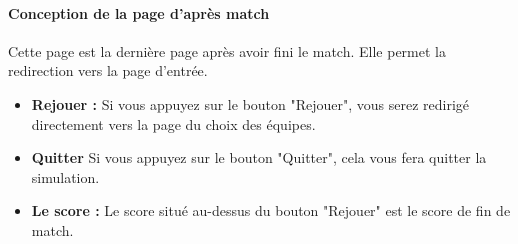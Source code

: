 \vspace{15pt}

\paragraph{Conception de la page d'après match}
    Cette page est la dernière page après avoir fini le match. Elle permet la redirection vers la page d'entrée.

\vspace{15pt}
    
\begin{itemize}
    \item \textbf{Rejouer :} 
        Si vous appuyez sur le bouton "Rejouer", vous serez redirigé directement vers la page du choix des équipes.

    \vspace{15pt}

    \item \textbf{Quitter} 
         Si vous appuyez sur le bouton "Quitter", cela vous fera quitter la simulation.

    \vspace{15pt}
            
    \item \textbf{Le score :}
        Le score situé au-dessus du bouton "Rejouer" est le score de fin de match.
        
    \vspace{15pt}
\end{itemize}